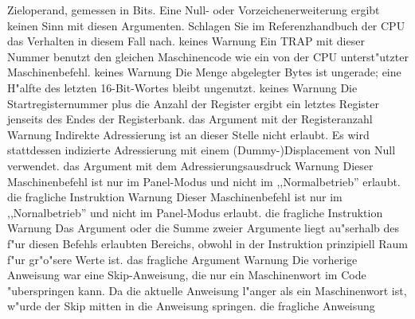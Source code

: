 \documentclass[12pt,a4paper,twoside]{report}
\begin{document}
\begin{description}
{                Zieloperand, gemessen in Bits.  Eine Null- oder Vorzeichenerweiterung
                ergibt keinen Sinn mit diesen Argumenten.  Schlagen Sie im 
                Referenzhandbuch der CPU das Verhalten in diesem Fall nach.}
               {keines}
               {Warnung}
               {Ein TRAP mit dieser Nummer benutzt den gleichen Maschinencode
                wie ein von der CPU unterst"utzter Maschinenbefehl.}
               {keines}
               {Warnung}
               {Die Menge abgelegter Bytes ist ungerade; eine H"alfte des letzten
                16-Bit-Wortes bleibt ungenutzt.}
               {keines}
               {Warnung}
               {Die Startregisternummer plus die Anzahl der Register ergibt ein
                letztes Register jenseits des Endes der Registerbank.}
               {das Argument mit der Registeranzahl}
               {Warnung}
               {Indirekte Adressierung ist an dieser Stelle nicht erlaubt.
                Es wird stattdessen indizierte Adressierung mit einem
                (Dummy-)Displacement von Null verwendet.}
               {das Argument mit dem Adressierungsausdruck}
               {Warnung}
               {Dieser Maschinenbefehl ist nur im Panel-Modus und nicht
                im ,,Normalbetrieb'' erlaubt.}
               {die fragliche Instruktion}
               {Warnung}
               {Dieser Maschinenbefehl ist nur im ,,Nornalbetrieb''
                und nicht im Panel-Modus erlaubt.}
               {die fragliche Instruktion}
               {Warnung}
               {Das Argument oder die Summe zweier Argumente
                liegt au"serhalb des f"ur diesen Befehls erlaubten
                Bereichs, obwohl in der Instruktion prinzipiell
                Raum f"ur gr"o"sere Werte ist.}
               {das fragliche Argument}
               {Warnung}
               {Die vorherige Anweisung war eine Skip-Anweisung, die
                nur ein Maschinenwort im Code "uberspringen kann. Da
                die aktuelle Anweisung l"anger als ein Maschinenwort
                ist, w"urde der Skip mitten in die Anweisung springen.}
               {die fragliche Anweisung}

\end{description}
\end{document}

